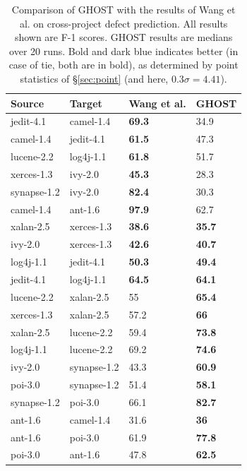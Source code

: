 \documentclass[10pt,compsoc,twocolumn]{IEEEtran}
\begin{document}
\begin{table}[!b]
    \centering
    \caption{Comparison of GHOST with the results of Wang et al. \cite{wang2016automatically} on cross-project defect prediction. All results shown are F-1 scores. GHOST results are medians over 20 runs. Bold and \colorbox{blue!10}{dark blue} indicates better (in case of tie, both are in bold), as determined by point statistics
     of \S\ref{sec:point} (and here, 
    $0.3 \sigma = 4.41$).}
    \label{tab:tan}
    \begin{tabular}{ ll|ll }
    \toprule
	\textbf{Source} & \textbf{Target} & \textbf{Wang et al.} & \textbf{GHOST} \\
	\midrule
	jedit-4.1 & camel-1.4 & \cellcolor{blue!10}\textbf{69.3}  & 34.9 \\ 
	camel-1.4 & jedit-4.1 & \cellcolor{blue!10}\textbf{61.5}  & 47.3 \\ 
	lucene-2.2 & log4j-1.1 & \cellcolor{blue!10}\textbf{61.8}  & 51.7 \\ 
	xerces-1.3 & ivy-2.0 & \cellcolor{blue!10}\textbf{45.3} & 28.3 \\ 
	synapse-1.2 & ivy-2.0 & \cellcolor{blue!10}\textbf{82.4}  & 30.3 \\
	camel-1.4 & ant-1.6 & \cellcolor{blue!10}\textbf{97.9}  & 62.7 \\
	xalan-2.5 & xerces-1.3 & \cellcolor{blue!10}\textbf{38.6} & \cellcolor{blue!10}\textbf{35.7} \\ 
	ivy-2.0 & xerces-1.3 & \cellcolor{blue!10}\textbf{42.6} & \cellcolor{blue!10}\textbf{40.7} \\ 
	log4j-1.1 & jedit-4.1 & \cellcolor{blue!10}\textbf{50.3} & \cellcolor{blue!10}\textbf{49.4} \\ 
	jedit-4.1 & log4j-1.1 & \cellcolor{blue!10}\textbf{64.5} & \cellcolor{blue!10}\textbf{64.1} \\
	lucene-2.2 & xalan-2.5 & 55  & \cellcolor{blue!10}\textbf{65.4} \\ 
	xerces-1.3 & xalan-2.5 & 57.2 & \cellcolor{blue!10}\textbf{66} \\ 
	xalan-2.5 & lucene-2.2 & 59.4 & \cellcolor{blue!10}\textbf{73.8} \\ 
	log4j-1.1 & lucene-2.2 & 69.2 & \cellcolor{blue!10}\textbf{74.6} \\ 

	ivy-2.0 & synapse-1.2 & 43.3 & \cellcolor{blue!10}\textbf{60.9} \\ 
	poi-3.0 & synapse-1.2 & 51.4 & \cellcolor{blue!10}\textbf{58.1} \\ 
	synapse-1.2 & poi-3.0 & 66.1 & \cellcolor{blue!10}\textbf{82.7} \\ 
	ant-1.6 & camel-1.4 & 31.6 & \cellcolor{blue!10}\textbf{36} \\ 
	ant-1.6 & poi-3.0 & 61.9 & \cellcolor{blue!10}\textbf{77.8} \\ 
	poi-3.0 & ant-1.6 & 47.8 & \cellcolor{blue!10}\textbf{62.5} \\ 
	\bottomrule
\end{tabular}
    
\end{table}
\end{document}
